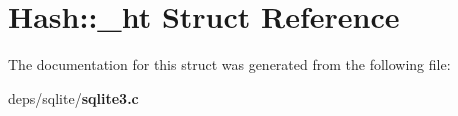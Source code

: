 \section{Hash::\_\-ht Struct Reference}
\label{structHash_1_1__ht}


The documentation for this struct was generated from the following file:\begin{CompactItemize}
\item 
deps/sqlite/\bf{sqlite3.c}\end{CompactItemize}
